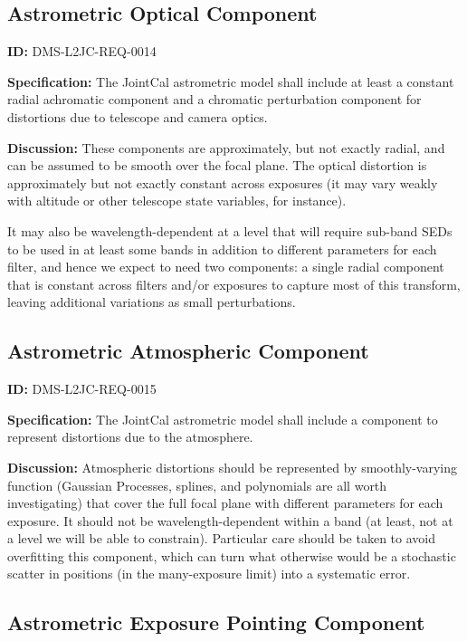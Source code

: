 \documentclass[SE,toc,lsstdraft]{lsstdoc}
\begin{document}
\subsection{Astrometric Optical Component}

\label{DMS-L2JC-REQ-0014}
\textbf{ID:} DMS-L2JC-REQ-0014

\textbf{Specification:}
The JointCal astrometric model shall include at least a constant radial achromatic component and a chromatic perturbation component for distortions due to telescope and camera optics.

\textbf{Discussion:}
These components are approximately, but not exactly radial, and can be assumed to be smooth over the focal plane.  The optical distortion is approximately but not exactly constant across exposures (it may vary weakly with altitude or other telescope state variables, for instance).

It may also be wavelength-dependent at a level that will require sub-band SEDs to be used in at least some bands in addition to different parameters for each filter, and hence we expect to need two components: a single radial component that is constant across filters and/or exposures to capture most of this transform, leaving additional variations as small perturbations.

\subsection{Astrometric Atmospheric Component}

\label{DMS-L2JC-REQ-0015}
\textbf{ID:} DMS-L2JC-REQ-0015

\textbf{Specification:}
The JointCal astrometric model shall include a component to represent distortions due to the atmosphere.

\textbf{Discussion:}
Atmospheric distortions should be represented by smoothly-varying function (Gaussian Processes, splines, and polynomials are all worth investigating) that cover the full focal plane with different parameters for each exposure.  It should not be wavelength-dependent within a band (at least, not at a level we will be able to constrain).  Particular care should be taken to avoid overfitting this component, which can turn what otherwise would be a stochastic scatter in positions (in the many-exposure limit) into a systematic error.

\subsection{Astrometric Exposure Pointing Component}
\end{document}
